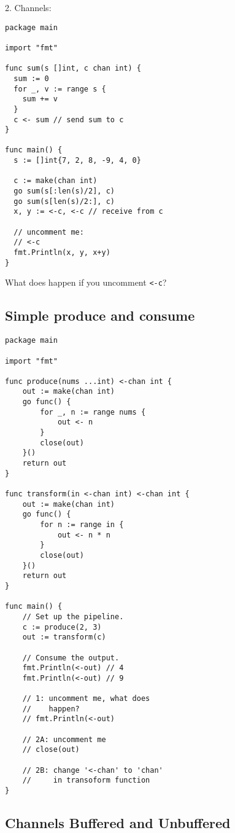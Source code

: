 \documentclass[11pt, letterpaper]{article}
\begin{document}
\bigskip

2. Channels:

\begin{verbatim}
package main

import "fmt"

func sum(s []int, c chan int) {
  sum := 0
  for _, v := range s {
    sum += v
  }
  c <- sum // send sum to c
}

func main() {
  s := []int{7, 2, 8, -9, 4, 0}

  c := make(chan int)
  go sum(s[:len(s)/2], c)
  go sum(s[len(s)/2:], c)
  x, y := <-c, <-c // receive from c

  // uncomment me:
  // <-c 
  fmt.Println(x, y, x+y)
}
\end{verbatim}

What does happen if you uncomment \texttt{<-c}?

\bigskip

\subsection{Simple produce and consume}

\begin{verbatim}
package main

import "fmt"

func produce(nums ...int) <-chan int {
    out := make(chan int)
    go func() {
        for _, n := range nums {
            out <- n
        }
        close(out)
    }()
    return out
}

func transform(in <-chan int) <-chan int {
    out := make(chan int)
    go func() {
        for n := range in {
            out <- n * n
        }
        close(out)
    }()
    return out
}

func main() {
    // Set up the pipeline.
    c := produce(2, 3)
    out := transform(c)

    // Consume the output.
    fmt.Println(<-out) // 4
    fmt.Println(<-out) // 9
    
    // 1: uncomment me, what does
    //    happen?
    // fmt.Println(<-out) 

    // 2A: uncomment me
    // close(out)

    // 2B: change '<-chan' to 'chan'
    //     in transoform function
}
\end{verbatim}


\subsection{Channels Buffered and Unbuffered}
\end{document}
